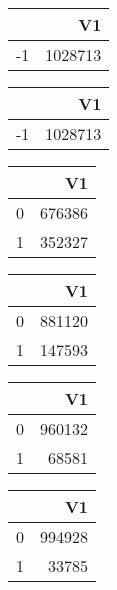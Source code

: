 \bigskip\bigskip
\centering
\begin{tabular}{rr}
  \hline
 & V1 \\ 
  \hline
-1 & 1028713 \\ 
   \hline
\end{tabular}

\bigskip\bigskip
\centering
\begin{tabular}{rr}
  \hline
 & V1 \\ 
  \hline
-1 & 1028713 \\ 
   \hline
\end{tabular}

\bigskip\bigskip
\centering
\begin{tabular}{rr}
  \hline
 & V1 \\ 
  \hline
0 & 676386 \\ 
  1 & 352327 \\ 
   \hline
\end{tabular}

\bigskip\bigskip
\centering
\begin{tabular}{rr}
  \hline
 & V1 \\ 
  \hline
0 & 881120 \\ 
  1 & 147593 \\ 
   \hline
\end{tabular}

\bigskip\bigskip
\centering
\begin{tabular}{rr}
  \hline
 & V1 \\ 
  \hline
0 & 960132 \\ 
  1 & 68581 \\ 
   \hline
\end{tabular}

\bigskip\bigskip
\centering
\begin{tabular}{rr}
  \hline
 & V1 \\ 
  \hline
0 & 994928 \\ 
  1 & 33785 \\ 
   \hline
\end{tabular}

